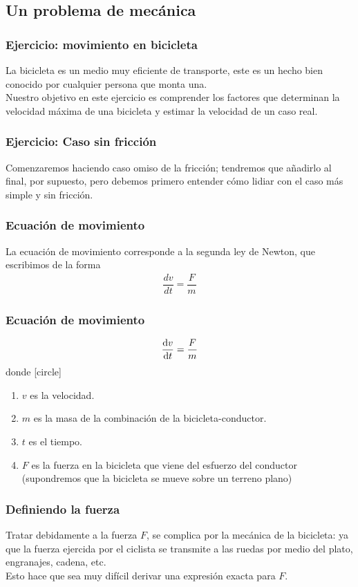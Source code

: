 \subsection{Un problema de mecánica}
\begin{frame}
\frametitle{Ejercicio: movimiento en bicicleta}
La bicicleta es un medio muy eficiente de transporte, este es un hecho bien conocido por cualquier persona que monta una. 
\\
\bigskip
Nuestro objetivo en este ejercicio es comprender los factores que determinan la velocidad máxima de una bicicleta y estimar la velocidad de un caso real.
\end{frame}
\begin{frame}
\frametitle{Ejercicio: Caso sin fricción}
Comenzaremos haciendo caso omiso de la fricción; tendremos que añadirlo al final, por supuesto, pero debemos primero entender cómo lidiar con el caso más simple y sin fricción.
\end{frame}
\begin{frame}
\frametitle{Ecuación de movimiento}
La ecuación de movimiento corresponde a la segunda ley de Newton, que escribimos de la forma
\begin{align}
\dfrac{dv}{dt} = \dfrac{F}{m}
\label{EqNewton2}
\end{align}
\end{frame}
\begin{frame}
\frametitle{Ecuación de movimiento}
\begin{equation*}
\dv{v}{t} = \dfrac{F}{m}
\end{equation*}
donde
[circle]
\begin{enumerate}[<+->]
\fontsize{13}{13}\selectfont
\item $v$ es la velocidad.
\item $m$ es la masa de la combinación de la bicicleta-conductor.
\item $t$ es el tiempo.
\item $F$ es la fuerza en la bicicleta que viene del esfuerzo del conductor (supondremos que la bicicleta se mueve sobre un terreno plano)
\end{enumerate}
\end{frame}
\begin{frame}
\frametitle{Definiendo la fuerza}
Tratar debidamente a la fuerza $F$, se complica por la mecánica de la bicicleta: ya que la fuerza ejercida por el ciclista se transmite a las ruedas por medio del plato, engranajes, cadena, etc.
\\
\medskip
Esto hace que sea muy difícil derivar una expresión exacta para $F$.
\end{frame}
